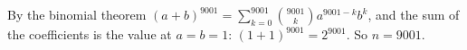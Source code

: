 By the binomial theorem $(a+b)^{9001}=\sum_{k=0}^{9001}\binom{9001}{k}a^{9001-k}b^k$, and the sum of the coefficients is the value at $a=b=1$: $(1+1)^{9001}=2^{9001}$. So $n=\boxed{9001}$.
